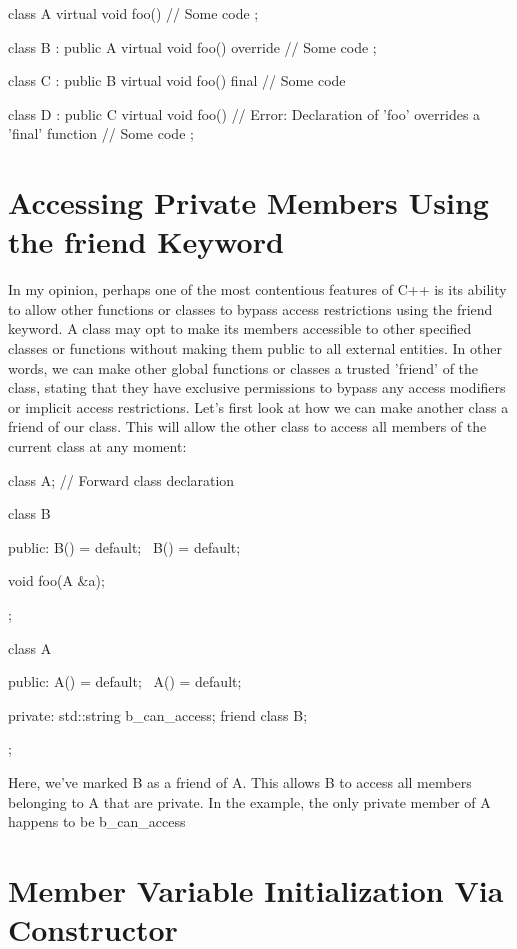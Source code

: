 \documentclass{article}
\begin{document}
\begin{cpplst}
class A {
    virtual void foo() {
        // Some code
	}
};

class B : public A {
    virtual void foo() override {
        // Some code
	}
};

class C : public B {
    virtual void foo() final {
        // Some code
	}
}

class D : public C {
    virtual void foo() { // Error: Declaration of 'foo' overrides a 'final' function
        // Some code
	}
};
\end{cpplst}

\section{Accessing Private Members Using the friend Keyword}

In my opinion, perhaps one of the most contentious features of C++ is its ability to allow other functions
or classes to bypass access restrictions using the friend keyword. A class may opt to make its members
accessible to other specified classes or functions without making them public to all external entities. In
other words, we can make other global functions or classes a trusted 'friend' of the class, stating that they
have exclusive permissions to bypass any access modifiers or implicit access restrictions. Let's first look
at how we can make another class a friend of our class. This will allow the other class to access all members
of the current class at any moment:

\begin{cpplst}
class A; // Forward class declaration

class B
{
public:
    B() = default;
    ~B() = default;

    void foo(A &a);
};

class A
{
public:
    A() = default;
    ~A() = default;

private:
    std::string b_can_access;
    friend class B;
};
\end{cpplst}

Here, we've marked B as a friend of A. This allows B to access all members belonging to A that are private.
In the example, the only private member of A happens to be b\_can\_access

\section{Member Variable Initialization Via Constructor}
\end{document}
